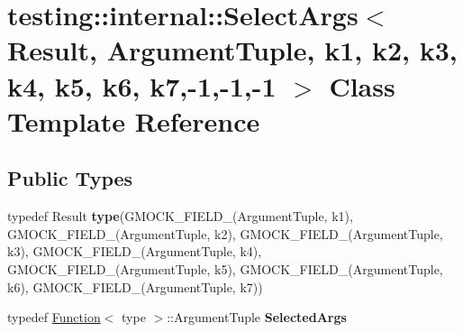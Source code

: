 \hypertarget{classtesting_1_1internal_1_1SelectArgs_3_01Result_00_01ArgumentTuple_00_01k1_00_01k2_00_01k3_00_d8106922b84b5ce2491b61ffee01e097}{}\section{testing\+:\+:internal\+:\+:Select\+Args$<$ Result, Argument\+Tuple, k1, k2, k3, k4, k5, k6, k7,-\/1,-\/1,-\/1 $>$ Class Template Reference}
\label{classtesting_1_1internal_1_1SelectArgs_3_01Result_00_01ArgumentTuple_00_01k1_00_01k2_00_01k3_00_d8106922b84b5ce2491b61ffee01e097}
\subsection*{Public Types}
\begin{DoxyCompactItemize}
\item 
typedef Result {\bfseries type}(G\+M\+O\+C\+K\+\_\+\+F\+I\+E\+L\+D\+\_\+(Argument\+Tuple, k1), G\+M\+O\+C\+K\+\_\+\+F\+I\+E\+L\+D\+\_\+(Argument\+Tuple, k2), G\+M\+O\+C\+K\+\_\+\+F\+I\+E\+L\+D\+\_\+(Argument\+Tuple, k3), G\+M\+O\+C\+K\+\_\+\+F\+I\+E\+L\+D\+\_\+(Argument\+Tuple, k4), G\+M\+O\+C\+K\+\_\+\+F\+I\+E\+L\+D\+\_\+(Argument\+Tuple, k5), G\+M\+O\+C\+K\+\_\+\+F\+I\+E\+L\+D\+\_\+(Argument\+Tuple, k6), G\+M\+O\+C\+K\+\_\+\+F\+I\+E\+L\+D\+\_\+(Argument\+Tuple, k7))\hypertarget{classtesting_1_1internal_1_1SelectArgs_3_01Result_00_01ArgumentTuple_00_01k1_00_01k2_00_01k3_00_d8106922b84b5ce2491b61ffee01e097_a253d700a1af06add7100c05277a6ae4d}{}\label{classtesting_1_1internal_1_1SelectArgs_3_01Result_00_01ArgumentTuple_00_01k1_00_01k2_00_01k3_00_d8106922b84b5ce2491b61ffee01e097_a253d700a1af06add7100c05277a6ae4d}

\item 
typedef \hyperlink{structtesting_1_1internal_1_1Function}{Function}$<$ type $>$\+::Argument\+Tuple {\bfseries Selected\+Args}\hypertarget{classtesting_1_1internal_1_1SelectArgs_3_01Result_00_01ArgumentTuple_00_01k1_00_01k2_00_01k3_00_d8106922b84b5ce2491b61ffee01e097_a921cc8e0f8e0453024d95e80933e7346}{}\label{classtesting_1_1internal_1_1SelectArgs_3_01Result_00_01ArgumentTuple_00_01k1_00_01k2_00_01k3_00_d8106922b84b5ce2491b61ffee01e097_a921cc8e0f8e0453024d95e80933e7346}

\end{DoxyCompactItemize}
